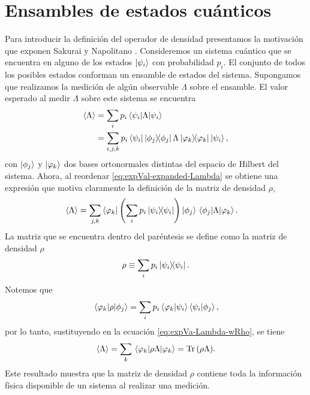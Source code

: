 \section{Ensambles de estados cuánticos} \label{sec:ensambles}

Para introducir la definición del operador de densidad presentamos la 
motivación que exponen Sakurai y Napolitano \cite{sakurai_napolitano_2017}.
Consideremos un sistema cuántico que se encuentra en alguno de los estados 
$\ket{\psi_{i} }$ con probabilidad $p_i$. El conjunto de todos los posibles estados
conforman un ensamble de estados del sistema. Supongamos que realizamos 
la medición de algún observable $\Lambda$ sobre el ensamble. El 
valor esperado al medir $\Lambda$ sobre este sistema se encuentra
\begin{align}\label{eq:expVal-expanded-Lambda}
	\expval{\Lambda} &= \sum_i p_i \matrixel{\psii}{\Lambda}{\psii}\nonumber\\
	&= \sum_{i,j,k} p_i 
	\bra{\psii}\dyad{\phi_j}{\phi_j}\Lambda\dyad{\varphi_k}{\varphi_k}\Pk{i},
\end{align}
con $\ket{\phi_j}$ y $\ket{\varphi_k}$ dos bases ortonormales distintas del
espacio de Hilbert del sistema. Ahora, al reordenar 
\eqref{eq:expVal-expanded-Lambda} se obtiene una expresión 
que motiva claramente la definición de la matriz de densidad $\rho$,
\begin{align}\label{eq:expVa-Lambda-wRho}
	\expval{\Lambda}&= \sum _{j,k}\bra{\varphi_k}\qty(\sum_ip_i \dyad{\psii}{\psii} 
	)\ket{\phi_j}	\matrixel{\phi_j}{\Lambda}{\varphi_k}.
\end{align}
La matriz que se encuentra dentro del paréntesis se define como 
la matriz de densidad 
$\rho$~\cite{nielsen_chuang_2011, sakurai_napolitano_2017}
\begin{equation}
	\rho \equiv \sum _i p_i\dyad{\psi_i}{\psi_i}.
	\label{eq:rho_def}
\end{equation}
Notemos que 
\begin{align}
	\matrixel{\varphi_k}{\rho}{\phi_j} = 
	\sum_ip_i \braket{\varphi_k}{\psii}\braket{\psii}{\phi_j},
\end{align}
por lo tanto, sustituyendo en la ecuación \eqref{eq:expVa-Lambda-wRho},
se tiene
\begin{align}\label{eq:Tr(rhoLambda)}
	\expval{\Lambda}=\sum _k \matrixel{\varphi_k}{\rho \Lambda}{\varphi_k} 
	= \Tr \qty(\rho\Lambda).
\end{align} 
Este resultado muestra que la matriz de densidad $\rho$ 
contiene toda la información física disponible de un sistema al 
realizar una medición.

